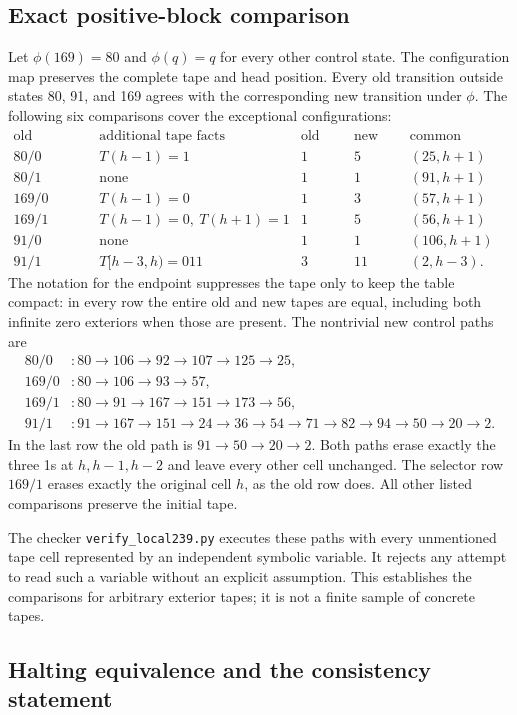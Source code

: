 \subsection{Exact positive-block comparison}

Let $\phi(169)=80$ and $\phi(q)=q$ for every other control state.  The
configuration map preserves the complete tape and head position.  Every
old transition outside states 80, 91, and 169 agrees with the corresponding
new transition under $\phi$.  The following six comparisons cover the
exceptional configurations:
\[
\begin{array}{c|l|c|c|c}
\text{old state/read}&\text{additional tape facts}&
\text{old steps}&\text{new steps}&\text{common endpoint}\\\hline
80/0&T(h-1)=1&1&5&(25,h+1)\\
80/1&\text{none}&1&1&(91,h+1)\\
169/0&T(h-1)=0&1&3&(57,h+1)\\
169/1&T(h-1)=0,\ T(h+1)=1&1&5&(56,h+1)\\
91/0&\text{none}&1&1&(106,h+1)\\
91/1&T[h-3,h)=011&3&11&(2,h-3).
\end{array}
\]
The notation for the endpoint suppresses the tape only to keep the table
compact: in every row the entire old and new tapes are equal, including
both infinite zero exteriors when those are present.  The nontrivial new
control paths are
\begin{align*}
80/0 &: 80\to106\to92\to107\to125\to25,\\
169/0 &:80\to106\to93\to57,\\
169/1 &:80\to91\to167\to151\to173\to56,\\
91/1 &:91\to167\to151\to24\to36\to54\to71
       \to82\to94\to50\to20\to2.
\end{align*}
In the last row the old path is $91\to50\to20\to2$.  Both paths erase
exactly the three 1s at $h,h-1,h-2$ and leave every other cell unchanged.
The selector row $169/1$ erases exactly the original cell $h$, as the old
row does.  All other listed comparisons preserve the initial tape.

The checker \texttt{verify\_local239.py} executes these paths with every
unmentioned tape cell represented by an independent symbolic variable.
It rejects any attempt to read such a variable without an explicit
assumption.  This establishes the comparisons for arbitrary exterior
tapes; it is not a finite sample of concrete tapes.

\subsection{Halting equivalence and the consistency statement}

